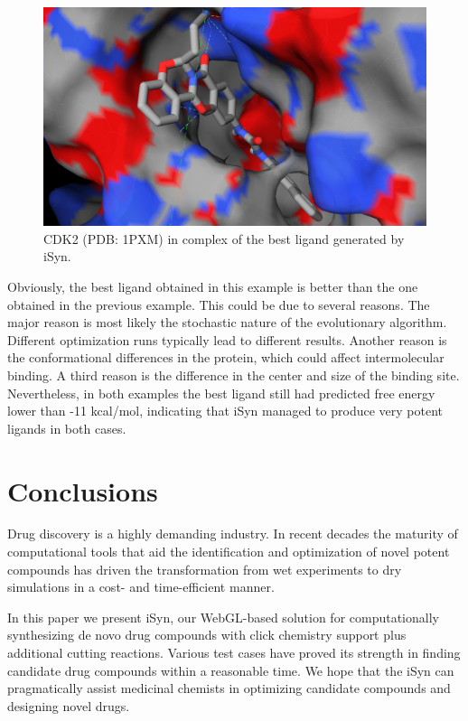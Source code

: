 \begin{figure}
\begin{center}
\includegraphics[width=\linewidth]{../isyn/1PXM.png}
\end{center}
\caption{CDK2 (PDB: 1PXM) in complex of the best ligand generated by iSyn.}
\label{fig:1PXM}
\end{figure}

Obviously, the best ligand obtained in this example is better than the one obtained in the previous example. This could be due to several reasons. The major reason is most likely the stochastic nature of the evolutionary algorithm. Different optimization runs typically lead to different results. Another reason is the conformational differences in the protein, which could affect intermolecular binding. A third reason is the difference in the center and size of the binding site. Nevertheless, in both examples the best ligand still had predicted free energy lower than -11 kcal/mol, indicating that iSyn managed to produce very potent ligands in both cases.

\section{Conclusions}

Drug discovery is a highly demanding industry. In recent decades the maturity of computational tools that aid the identification and optimization of novel potent compounds has driven the transformation from wet experiments to dry simulations in a cost- and time-efficient manner.

In this paper we present iSyn, our WebGL-based solution for computationally synthesizing de novo drug compounds with click chemistry support plus additional cutting reactions. Various test cases have proved its strength in finding candidate drug compounds within a reasonable time. We hope that the iSyn can pragmatically assist medicinal chemists in optimizing candidate compounds and designing novel drugs.

